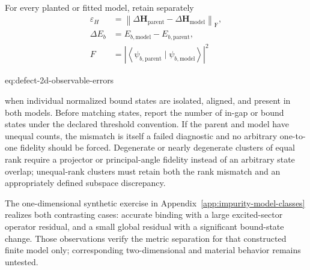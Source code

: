 For every planted or fitted model, retain separately
\begin{align}
    \varepsilon_H
    &=
    \left\lVert
        \Delta\mathbf H_{
        \mathrm{parent}}
        -
        \Delta\mathbf H_{
        \mathrm{model}}
    \right\rVert_{
    \mathrm F},
    \\
    \Delta E_b
    &=
    E_{b,\mathrm{model}}
    -
    E_{b,\mathrm{parent}},
    \\
    F
    &=
    \left|
        \left\langle
            \psi_{b,\mathrm{parent}}
            \mid
            \psi_{b,\mathrm{model}}
        \right\rangle
    \right|^2
    \label{eq:defect-2d-observable-errors}
\end{align}
\begin{equationterms}{eq:defect-2d-observable-errors}
\end{equationterms}
when individual normalized bound states are isolated, aligned, and present in
both models. Before matching states, report the number of in-gap or bound states
under the declared threshold convention. If the parent and model have unequal
counts, the mismatch is itself a failed diagnostic and no arbitrary one-to-one
fidelity should be forced. Degenerate or nearly degenerate clusters of equal
rank require a projector or principal-angle fidelity instead of an arbitrary
state overlap; unequal-rank clusters must retain both the rank mismatch and an
appropriately defined subspace discrepancy.

The one-dimensional synthetic exercise in
Appendix~\ref{app:impurity-model-classes} realizes both contrasting cases:
accurate binding with a large excited-sector operator residual, and a small
global residual with a significant bound-state change. Those observations
verify the metric separation for that constructed finite model only;
corresponding two-dimensional and material behavior remains untested.

